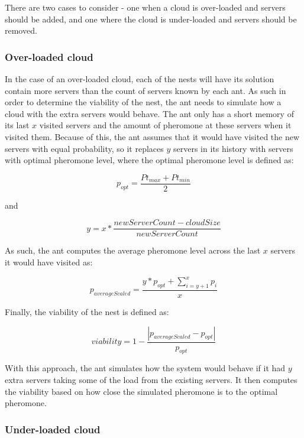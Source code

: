 \documentclass[conference]{IEEEtran}
\begin{document}
There are two cases to consider - one when a cloud is over-loaded and servers should be added, and one where the cloud is under-loaded and servers should be removed.

\subsubsection{Over-loaded cloud}

In the case of an over-loaded cloud, each of the nests will have its solution contain more servers than the count of servers known by each ant. As such in order to determine the viability of the nest, the ant needs to simulate how a cloud with the extra servers would behave. The ant only has a short memory of its last $x$ visited servers and the amount of pheromone at these servers when it visited them. Because of this, the ant assumes that it would have visited the new servers with equal probability, so it replaces $y$ servers in its history with servers with optimal pheromone level, where the optimal pheromone level is defined as:

\begin{equation}
	p_{opt} = \frac{Pt_{max} + Pt_{min}}{2}
\end{equation}

and 

\begin{equation}
	y = x * \frac{newServerCount - cloudSize}{newServerCount}
\end{equation}

As such, the ant computes the average pheromone level across the last $x$ servers it would have visited as:

\begin{equation}
	p_{averageScaled} = \frac{y * p_{opt} + \sum\limits_{i=y+1}^x p_{i}}{x}
\end{equation}

Finally, the viability of the nest is defined as:

\begin{equation}
	viability = 1 - \frac{\left|p_{averageScaled} - p_{opt}\right|}{p_{opt}}
\end{equation}

With this approach, the ant simulates how the system would behave if it had $y$ extra servers taking some of the load from the existing servers. It then computes the viability based on how close the simulated pheromone is to the optimal pheromone.

\subsubsection{Under-loaded cloud}
\end{document}
